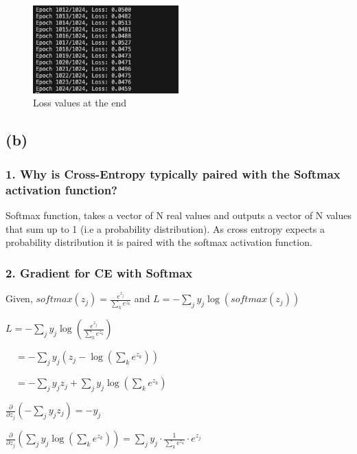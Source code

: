 \documentclass[11pt]{article}
\numberwithin{equation}{section}
\begin{document}
\begin{figure}[H]
  \centering %
  \includegraphics[width=0.5\textwidth]{images/e1_loss.png} %
  \caption{Loss values at the end} %
\end{figure}

\subsection*{(b)}
\subsubsection*{1. Why is Cross-Entropy typically paired with the Softmax activation function?}
Softmax function, takes a vector of N real values and outputs a vector of N values that sum up to 1 (i.e a probability distribution). As cross entropy expects a probability distribution it is paired with the softmax activation function.

\subsubsection*{2. Gradient for CE with Softmax}

Given,
$softmax(z_j) = \frac{e^{z_j}}{\sum_k e^{z_k}}$
and
$L = - \sum_j y_j \log(softmax(z_j))$
\vspace{0.1cm}

$L = - \sum_j y_j \log\left(\frac{e^{z_j}}{\sum_k e^{z_k}}\right)$

$\quad= - \sum_j y_j \left( z_j - \log\left(\sum_k e^{z_k}\right) \right)$

$\quad= - \sum_j y_j z_j + \sum_j y_j \log\left(\sum_k e^{z_k}\right)$

\vspace{0.3cm}

$\frac{\partial}{\partial z_j} \left(- \sum_j y_j z_j\right) = -y_j$

\vspace{0.3cm}

$\frac{\partial}{\partial z_j} \left( \sum_j y_j \log\left(\sum_k e^{z_k}\right) \right) = \sum_j y_j \cdot \frac{1}{\sum_k e^{z_k}} \cdot e^{z_j} $
\vspace{0.3cm}
\end{document}
